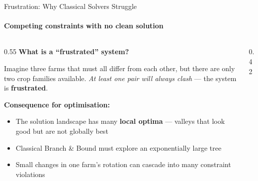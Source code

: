 \begin{frame}{Frustration: Why Classical Solvers Struggle}
    \framesubtitle{Competing constraints with no clean solution}

    \begin{columns}[T]
        \begin{column}{0.55\textwidth}
            \textbf{What is a ``frustrated'' system?}
            \vspace{0.2cm}

            Imagine three farms that must all differ from each other,
            but there are only two crop families available.
            \emph{At least one pair will always clash} — the system
            is \textbf{frustrated}.

            \vspace{0.4cm}
            \textbf{Consequence for optimisation:}
            \vspace{0.2cm}
            \begin{itemize}
                \item The solution landscape has many
                      \textbf{local optima} — valleys that look good
                      but are not globally best
                \item Classical Branch \& Bound must explore
                      an exponentially large tree
                \item Small changes in one farm's rotation
                      can cascade into many constraint violations
            \end{itemize}
        \end{column}
        \begin{column}{0.42\textwidth}
            \vspace{0.3cm}


\end{column}
\end{columns}
\end{frame}
